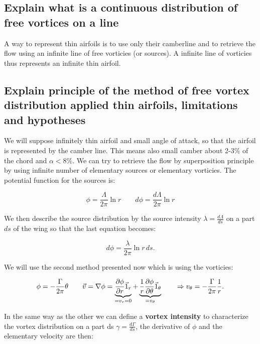 \documentclass[british,french,11pt, a4paper, openany]{article}
\begin{document}
\subsection{Explain what is a continuous distribution of free vortices on a line}

A way to represent thin airfoils is to use only their camberline and to retrieve the flow using an infinite line of free vorticies (or sources). A infinite line of vorticies thus represents an infinite thin airfoil.

\subsection{Explain principle of the method of free vortex distribution applied thin airfoils,
	limitations and hypotheses}

We will suppose infinitely thin airfoil and small angle of attack, so that the airfoil is represented by the camber line. This means also small camber about 2-3\% of the chord and $\alpha <8\%$. We can try to retrieve the flow by superposition principle by using infinite number of elementary sources or elementary vorticies. The potential function for the sources is:

\begin{equation}
\phi = \frac{\Lambda}{2\pi} \ln r \qquad d\phi = \frac{d\Lambda}{2\pi} \ln r
\end{equation}		

We then describe the source distribution by the source intensity $\lambda = \frac{d\Lambda}{ds}$ on a part $ds$ of the wing so that the last equation becomes:

\begin{equation}
d\phi = \frac{\lambda}{2\pi} \ln r\, ds.
\end{equation}

We will use the second method presented now which is using the vorticies: 

\begin{equation}
\phi = -\frac{\Gamma}{2\pi} \theta \qquad \vec{v} = \nabla \phi = \underbrace{\frac{\D \phi}{\D r} \vec{1}_r}_{= v_r = 0} + \underbrace{\frac{1}{r} \frac{\D \phi}{\D \theta} \vec{1} _\theta}_{= v_\theta} \qquad \Rightarrow v_\theta = -\frac{\Gamma }{2\pi} \frac{1}{r}.
\end{equation}

In the same way as the other we can define a \textbf{vortex intensity} to characterize the vortex distribution on a part ds $\gamma = \frac{d\Gamma}{ds}$, the derivative of $\phi$ and the elementary velocity are then: 
\end{document}
